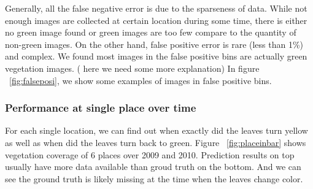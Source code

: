 
Generally, all the false negative error is due to the sparseness of data. While not enough images are collected at certain location during some time, there is either no green image found or green images are too few compare to the quantity of non-green images. On the other hand, false positive error is rare (less than 1\%) and complex. We found most images in the false positive bins are actually green vegetation images. ( here we need some more explanation) In figure ~\ref{fig:falseposi}, we show some examples of images in false positive bins.



\subsubsection{Performance at single place over time}
For each single location, we can find out when exactly did the leaves turn yellow as well as when
did the leaves turn back to green. 
Figure ~\ref{fig:placeinbar} shows vegetation coverage of 6 places over 2009 and 2010. 
Prediction results on top usually have more data available than groud truth on the bottom. 
And we can see the ground truth is likely missing at the time when the leaves change color. 

